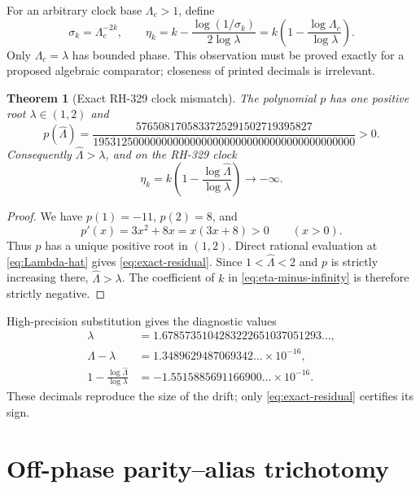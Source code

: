 \documentclass[11pt]{article}
\newtheorem{theorem}{Theorem}[section]
\theoremstyle{remark}
\newcommand{\wh}{\widehat}
\begin{document}
For an arbitrary clock base $\Lambda_c>1$, define
\begin{equation}\label{eq:clock-and-phase}
 \sigma_k=\Lambda_c^{-2k},
 \qquad
 \eta_k=k-\frac{\log(1/\sigma_k)}{2\log\lambda}
 =k\left(1-\frac{\log\Lambda_c}{\log\lambda}\right).
\end{equation}
Only $\Lambda_c=\lambda$ has bounded phase.  This observation must be proved
exactly for a proposed algebraic comparator; closeness of printed decimals is
irrelevant.

\begin{theorem}[Exact RH-329 clock mismatch]\label{thm:clock-mismatch}
The polynomial $p$ has one positive root $\lambda\in(1,2)$ and
\begin{equation}\label{eq:exact-residual}
 p(\wh\Lambda)=
 \frac{5765081705833725291502719395827}
 {1953125000000000000000000000000000000000000000}>0.
\end{equation}
Consequently $\wh\Lambda>\lambda$, and on the RH-329 clock
\begin{equation}\label{eq:eta-minus-infinity}
 \eta_k=k\left(1-\frac{\log\wh\Lambda}{\log\lambda}\right)
 \longrightarrow-\infty.
\end{equation}
\end{theorem}

\begin{proof}
We have $p(1)=-11$, $p(2)=8$, and
\begin{equation*}
 p'(x)=3x^2+8x=x(3x+8)>0\qquad(x>0).
\end{equation*}
Thus $p$ has a unique positive root in $(1,2)$.  Direct rational evaluation
at \eqref{eq:Lambda-hat} gives \eqref{eq:exact-residual}.  Since
$1<\wh\Lambda<2$ and $p$ is strictly increasing there,
$\wh\Lambda>\lambda$.  The coefficient of $k$ in
\eqref{eq:eta-minus-infinity} is therefore strictly negative.
\end{proof}

High-precision substitution gives the diagnostic values
\begin{align}
 \lambda&=1.6785735104283222651037051293\ldots,\nonumber\\
 \wh\Lambda-\lambda&=1.3489629487069342\ldots\times10^{-16},\nonumber\\
 1-\frac{\log\wh\Lambda}{\log\lambda}
 &=-1.5515885691166900\ldots\times10^{-16}.
 \label{eq:diagnostics}
\end{align}
These decimals reproduce the size of the drift; only
\eqref{eq:exact-residual} certifies its sign.

\section{Off-phase parity--alias trichotomy}
\end{document}
